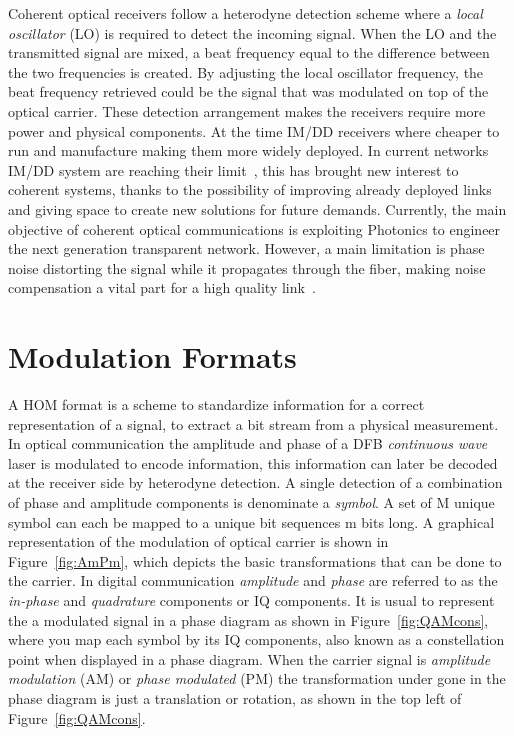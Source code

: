  Coherent optical receivers follow a heterodyne detection scheme where a \textit{local oscillator} (LO) is required to detect the incoming signal. When the LO and the transmitted signal are mixed, a beat frequency equal to the difference between the two frequencies is created. By adjusting the local oscillator frequency, the beat frequency retrieved could be the signal that was modulated on top of the optical carrier. These detection arrangement makes the receivers require more power and physical components. At the time IM/DD receivers where cheaper to run and manufacture making them more widely deployed. In current networks IM/DD system are reaching their limit~\cite{COChistory}, this has brought new interest to coherent systems, thanks to the possibility of improving already deployed links and giving space to create new solutions for future demands. Currently, the main objective of coherent optical communications is exploiting Photonics to engineer the next generation transparent network. However, a main limitation is phase noise distorting the signal while it propagates through the fiber, making noise compensation a vital part for a high quality link~\cite{behrens2010nonlinear}.

\section{ Modulation Formats }\label{sec:modform}
 
 
 A HOM format is a scheme to standardize information for a correct representation of a signal, to extract a bit stream from a physical measurement. In optical communication the amplitude and phase of a DFB \textit{continuous wave} laser is modulated to encode information, this information can later be decoded at the receiver side by heterodyne detection. A single detection of a combination of phase and amplitude components is denominate a \textit{symbol}. A set of M unique symbol can each be mapped to a unique bit sequences m bits long. A graphical representation of the modulation  of  optical carrier is shown in Figure~\ref{fig:AmPm}, which depicts the basic transformations that can be done to the carrier. In digital communication  \textit{amplitude} and \textit{phase} are referred to as the \textit{in-phase} and \textit{quadrature} components or IQ components. It is usual to represent the a modulated signal in a phase diagram as shown in Figure~\ref{fig:QAMcons}, where you map each symbol by its IQ components, also known as a constellation point when displayed in a phase diagram. When the carrier signal is  \textit{amplitude modulation} (AM) or \textit{phase modulated} (PM) the transformation under gone in the phase diagram is just a translation or rotation, as shown in the top left of Figure~\ref{fig:QAMcons}.
 
